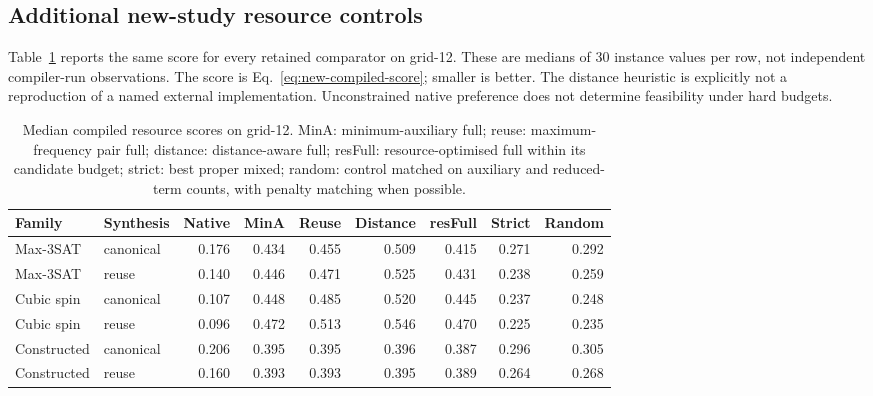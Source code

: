 \documentclass[a4paper,onecolumn,11pt,unpublished]{quantumarticle}
\theoremstyle{remark}
\begin{document}
\subsection{Additional new-study resource controls}

\label{app:new-resource-controls}

Table~\ref{tab:new-resource-baselines} reports the same score for every retained comparator on grid-12. These are medians of 30 instance values per row, not independent compiler-run observations. The score is Eq.~\eqref{eq:new-compiled-score}; smaller is better. The distance heuristic is explicitly not a reproduction of a named external implementation. Unconstrained native preference does not determine feasibility under hard budgets.

\begin{table}[htbp]\centering\footnotesize

\caption{Median compiled resource scores on grid-12. MinA: minimum-auxiliary full; reuse: maximum-frequency pair full; distance: distance-aware full; resFull: resource-optimised full within its candidate budget; strict: best proper mixed; random: control matched on auxiliary and reduced-term counts, with penalty matching when possible.}

\label{tab:new-resource-baselines}

\begin{tabular}{llrrrrrrr}\toprule

Family & Synthesis & Native & MinA & Reuse & Distance & resFull & Strict & Random\\\midrule

Max-3SAT & canonical & 0.176 & 0.434 & 0.455 & 0.509 & 0.415 & 0.271 & 0.292\\

Max-3SAT & reuse & 0.140 & 0.446 & 0.471 & 0.525 & 0.431 & 0.238 & 0.259\\

Cubic spin & canonical & 0.107 & 0.448 & 0.485 & 0.520 & 0.445 & 0.237 & 0.248\\

Cubic spin & reuse & 0.096 & 0.472 & 0.513 & 0.546 & 0.470 & 0.225 & 0.235\\

Constructed & canonical & 0.206 & 0.395 & 0.395 & 0.396 & 0.387 & 0.296 & 0.305\\

Constructed & reuse & 0.160 & 0.393 & 0.393 & 0.395 & 0.389 & 0.264 & 0.268\\

\bottomrule\end{tabular}\end{table}
\end{document}
